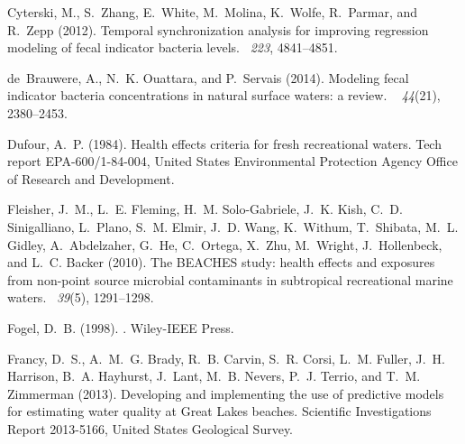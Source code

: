 \documentclass[authoryear,review, 12pt]{elsarticle}
\begin{document}
\begin{thebibliography}{}
Cyterski, M., S.~Zhang, E.~White, M.~Molina, K.~Wolfe, R.~Parmar, and R.~Zepp
  (2012).
\newblock Temporal synchronization analysis for improving regression modeling
  of fecal indicator bacteria levels.
~{\em 223}, 4841--4851.

de~Brauwere, A., N.~K. Ouattara, and P.~Servais (2014).
\newblock Modeling fecal indicator bacteria concentrations in natural surface
  waters: a review.
~{\em
  44\/}(21), 2380--2453.

Dufour, A.~P. (1984).
\newblock Health effects criteria for fresh recreational waters.
\newblock Tech report EPA-600/1-84-004, {United States Environmental Protection
  Agency Office of Research and Development}.

Fleisher, J.~M., L.~E. Fleming, H.~M. Solo-Gabriele, J.~K. Kish, C.~D.
  Sinigalliano, L.~Plano, S.~M. Elmir, J.~D. Wang, K.~Withum, T.~Shibata, M.~L.
  Gidley, A.~Abdelzaher, G.~He, C.~Ortega, X.~Zhu, M.~Wright, J.~Hollenbeck,
  and L.~C. Backer (2010).
\newblock The {BEACHES} study: health effects and exposures from non-point source
  microbial contaminants in subtropical recreational marine waters.
~{\em 39\/}(5),
  1291--1298.

Fogel, D.~B. (1998).
.
\newblock Wiley-IEEE Press.

Francy, D.~S., A.~M.~G. Brady, R.~B. Carvin, S.~R. Corsi, L.~M. Fuller, J.~H.
  Harrison, B.~A. Hayhurst, J.~Lant, M.~B. Nevers, P.~J. Terrio, and T.~M.
  Zimmerman (2013).
\newblock Developing and implementing the use of predictive models for
  estimating water quality at {G}reat {L}akes beaches.
\newblock Scientific Investigations Report 2013-5166, United States Geological
  Survey.


\end{thebibliography}
\end{document}
